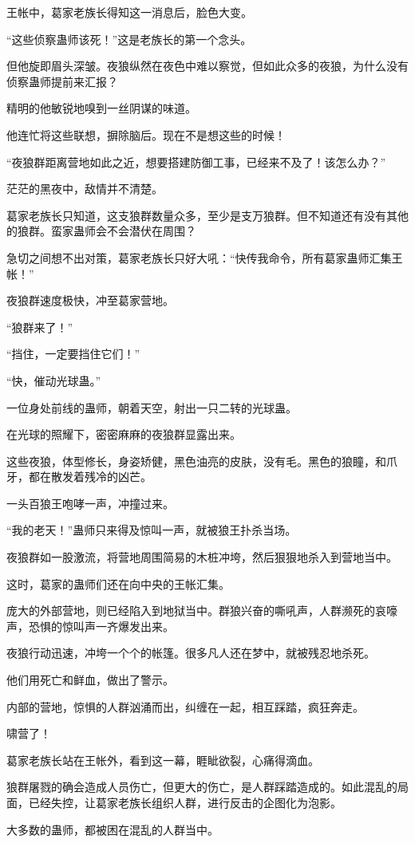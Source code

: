 \begin{this_body}
王帐中，葛家老族长得知这一消息后，脸色大变。

“这些侦察蛊师该死！”这是老族长的第一个念头。

但他旋即眉头深皱。夜狼纵然在夜色中难以察觉，但如此众多的夜狼，为什么没有侦察蛊师提前来汇报？

精明的他敏锐地嗅到一丝阴谋的味道。

他连忙将这些联想，摒除脑后。现在不是想这些的时候！

“夜狼群距离营地如此之近，想要搭建防御工事，已经来不及了！该怎么办？”

茫茫的黑夜中，敌情并不清楚。

葛家老族长只知道，这支狼群数量众多，至少是支万狼群。但不知道还有没有其他的狼群。蛮家蛊师会不会潜伏在周围？

急切之间想不出对策，葛家老族长只好大吼：“快传我命令，所有葛家蛊师汇集王帐！”

夜狼群速度极快，冲至葛家营地。

“狼群来了！”

“挡住，一定要挡住它们！”

“快，催动光球蛊。”

一位身处前线的蛊师，朝着天空，射出一只二转的光球蛊。

在光球的照耀下，密密麻麻的夜狼群显露出来。

这些夜狼，体型修长，身姿矫健，黑色油亮的皮肤，没有毛。黑色的狼瞳，和爪牙，都在散发着残冷的凶芒。

一头百狼王咆哮一声，冲撞过来。

“我的老天！”蛊师只来得及惊叫一声，就被狼王扑杀当场。

夜狼群如一股激流，将营地周围简易的木桩冲垮，然后狠狠地杀入到营地当中。

这时，葛家的蛊师们还在向中央的王帐汇集。

庞大的外部营地，则已经陷入到地狱当中。群狼兴奋的嘶吼声，人群濒死的哀嚎声，恐惧的惊叫声一齐爆发出来。

夜狼行动迅速，冲垮一个个的帐篷。很多凡人还在梦中，就被残忍地杀死。

他们用死亡和鲜血，做出了警示。

内部的营地，惊惧的人群汹涌而出，纠缠在一起，相互踩踏，疯狂奔走。

啸营了！

葛家老族长站在王帐外，看到这一幕，睚眦欲裂，心痛得滴血。

狼群屠戮的确会造成人员伤亡，但更大的伤亡，是人群踩踏造成的。如此混乱的局面，已经失控，让葛家老族长组织人群，进行反击的企图化为泡影。

大多数的蛊师，都被困在混乱的人群当中。


\end{this_body}

